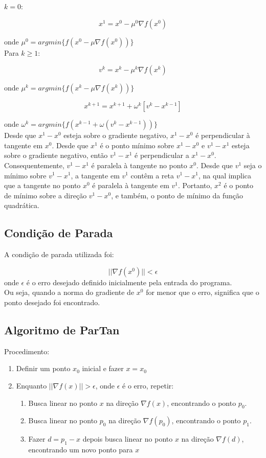 \documentclass[12pt]{article}
\begin{document}
$k = 0:$

$$x^{1} = x^{0} - \mu^{0}\nabla f(x^{0})$$ 

onde $\mu^{0} = argmin \lbrace f(x^{0} - \mu\nabla f(x^{0}))\rbrace$ \\

Para $k \geqslant 1:$

$$v^{k} = x^{k} - \mu^{k}\nabla f(x^{k})$$

onde $\mu^{k} = argmin\lbrace f(x^{k} - \mu\nabla f(x^{k}))\rbrace$

$$x^{k+1} =  x^{k+1} + \omega^{k}[v^{k} - x^{k-1}]$$

onde $\omega^{k} = argmin\lbrace f(x^{k-1} + \omega(v^{k} - x^{k-1}))\rbrace$\\

Desde que $x^{1} - x^{0}$ esteja sobre o gradiente negativo, $x^{1} - x^{0}$ é perpendicular à tangente em $x^{0}$. Desde que $x^{1}$ é o ponto mínimo sobre  $x^{1} - x^{0}$ e $v^{1} - x^{1}$ esteja sobre o gradiente negativo, então $v^{1} - x^{1}$ é perpendicular a  $x^{1} - x^{0}$. Consequentemente, $v^{1} - x^{1}$ é paralela à tangente no ponto $x^{0}$. Desde que $v^{1}$ seja o mínimo sobre $v^{1} - x^{1}$, a tangente em $v^{1}$ contêm a reta $v^{1} - x^{1}$, na qual implica que a tangente no ponto $x^{0}$ é paralela à tangente em $v^{1}$. Portanto, $x^{2}$ é o ponto de mínimo sobre a direção $v^{1} - x^{0}$, e também, o ponto de mínimo da função quadrática. 

\subsection{Condição de Parada}
\mbox{}

A condição de parada utilizada foi:

$$ ||\nabla f(x^{0})|| < \epsilon $$ onde $\epsilon$ é o erro desejado definido inicialmente pela entrada do programa.\\

Ou seja, quando a norma do gradiente de $x^{0}$ for menor que o erro, significa que o ponto desejado foi encontrado.

\subsection{Algoritmo de ParTan}
\mbox{}
Procedimento:

\begin{enumerate}
	\item Definir um ponto $x_{0}$ inicial e fazer $x = x_{0}$
	\item Enquanto $||\nabla f(x)|| > \epsilon$, onde $\epsilon$ é o erro, repetir:
	\begin{enumerate}
		\item Busca linear no ponto $x$ na direção $\nabla f(x)$, encontrando o ponto $p_0$.
		\item Busca linear no ponto $p_0$ na direção $\nabla f(p_0)$, encontrando o ponto $p_1$.
		\item Fazer $d = p_1 - x$ depois busca linear no ponto $x$ na direção $\nabla f(d)$, encontrando um novo ponto para $x$
	\end{enumerate}
\end{enumerate}
\end{document}
